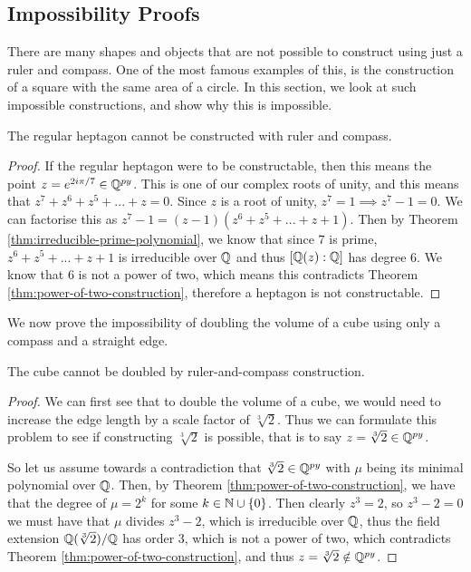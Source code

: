 \subsection{Impossibility Proofs}

There are many shapes and objects that are not possible to construct using just a ruler and compass. One of the most famous examples of this, is the construction of a square with the same area of a circle. In this section, we look at such impossible constructions, and show why this is impossible.

\begin{theorem}
    The regular heptagon cannot be constructed with ruler and compass.
\end{theorem}

\begin{proof}
    If the regular heptagon were to be constructable, then this means the point $z=e^{2i\pi/7} \in \mathbb Q^{py}$. This is one of our complex roots of unity, and this means that $z^7+z^6+z^5+...+z=0$. Since $z$ is a root of unity, $z^7=1 \implies z^7 - 1 = 0$. We can factorise this as $z^7-1=(z-1)(z^6+z^5+...+z+1)$. Then by Theorem \ref{thm:irreducible-prime-polynomial}, we know that since $7$ is prime, $z^6+z^5+...+z+1$ is irreducible over $\mathbb Q$ and thus $[\mathbb Q(z):\mathbb Q]$ has degree $6$. We know that $6$ is not a power of two, which means this contradicts Theorem \ref{thm:power-of-two-construction}, therefore a heptagon is not constructable.
\end{proof}

We now prove the impossibility of doubling the volume of a cube using only a compass and a straight edge.

\begin{theorem}
    The cube cannot be doubled by ruler-and-compass construction.
\end{theorem}

\begin{proof}  
    We can first see that to double the volume of a cube, we would need to increase the edge length by a scale factor of $\sqrt[3]{2}$. Thus we can formulate this problem to see if constructing $\sqrt[3]{2}$ is possible, that is to say $z = \sqrt[3]{2} \in \mathbb Q^{py}$.

    So let us assume towards a contradiction that $\sqrt[3]{2} \in \mathbb Q^{py}$ with $\mu$ being its minimal polynomial over $\mathbb Q$. Then, by Theorem \ref{thm:power-of-two-construction}, we have that the degree of $\mu = 2^k$ for some $k\in \mathbb N \cup \{0\}$.
    Then clearly $z^3=2$, so $z^3-2=0$ we must have that $\mu$ divides $z^3-2$, which is irreducible over $\mathbb Q$, thus the field extension $\mathbb Q(\sqrt[3]{2})/\mathbb Q$ has order $3$, which is not a power of two, which contradicts Theorem \ref{thm:power-of-two-construction}, and thus $z = \sqrt[3]{2} \notin \mathbb Q^{py}$.
\end{proof}


